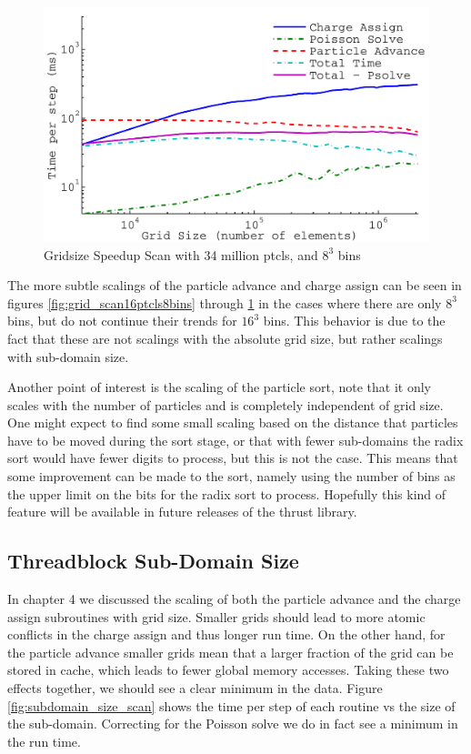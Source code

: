 \begin{figure}
\begin{center}
\includegraphics[width=6in]{performance/gridsize_speedup_scan.pdf}
\end{center}
\caption{Gridsize Speedup Scan with 34 million ptcls, and $8^3$ bins}
\label{fig:grid_scan34ptcls16bins}
\end{figure}

The more subtle scalings of the particle advance and charge assign can be seen in figures \ref{fig:grid_scan16ptcls8bins} through \ref{fig:grid_scan34ptcls16bins} in the cases where there are only $8^3$ bins, but do not continue their trends for $16^3$ bins. This behavior is due to the fact that these are not scalings with the absolute grid size, but rather scalings with sub-domain size.

Another point of interest is the scaling of the particle sort, note that it only scales with the number of particles and is completely independent of grid size. One might expect to find some small scaling based on the distance that particles have to be moved during the sort stage, or that with fewer sub-domains the radix sort would have fewer digits to process, but this is not the case. This means that some improvement can be made to the sort, namely using the number of bins as the upper limit on the bits for the radix sort to process. Hopefully this kind of feature will be available in future releases of the thrust library.



\subsection{Threadblock Sub-Domain Size}
In chapter 4 we discussed the scaling of both the particle advance and the charge assign subroutines with grid size. Smaller grids should lead to more atomic conflicts in the charge assign and thus longer run time. On the other hand, for the particle advance smaller grids mean that a larger fraction of the grid can be stored in cache, which leads to fewer global memory accesses. Taking these two effects together, we should see a clear minimum in the data. Figure \ref{fig:subdomain_size_scan} shows the time per step of each routine vs the size of the sub-domain. Correcting for the Poisson solve we do in fact see a minimum in the run time. 

